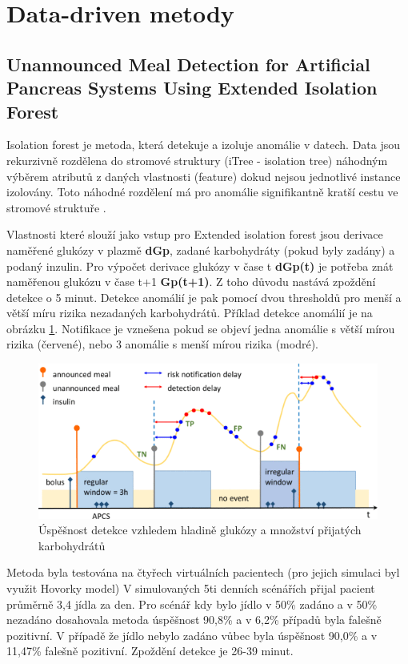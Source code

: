 \section{Data-driven metody}
\subsection{Unannounced Meal Detection for Artificial Pancreas Systems Using Extended Isolation Forest \citep{Analyza.ExtendedIsolationForest}}
\label{ch:forest}

Isolation forest je metoda, která detekuje a izoluje anomálie v datech. Data jsou rekurzivně rozdělena do stromové struktury (iTree - isolation tree) náhodným výběrem atributů z daných vlastnosti (feature) dokud nejsou jednotlivé instance izolovány. Toto náhodné rozdělení má pro anomálie signifikantně kratší cestu ve stromové struktuře \citep{Analyza.IsolationForest}.

Vlastnosti které slouží jako vstup pro Extended isolation forest jsou derivace naměřené glukózy v plazmě \textbf{dGp}, zadané karbohydráty (pokud byly zadány) a podaný inzulin. Pro výpočet derivace glukózy v čase t \textbf{dGp(t)} je potřeba znát naměřenou glukózu v čase t+1 \textbf{Gp(t+1)}. Z toho důvodu nastává zpoždění detekce o 5 minut. Detekce anomálií je pak pomocí dvou thresholdů pro menší a větší míru rizika nezadaných karbohydrátů.
Příklad detekce anomálií je na obrázku \ref{fig:forest}. Notifikace je vznešena pokud se objeví jedna anomálie s větší mírou rizika (červené), nebo 3 anomálie s menší mírou rizika (modré).

\begin{figure}[H]
\caption{Úspěšnost detekce vzhledem hladině glukózy a množství přijatých karbohydrátů}
\label{fig:forest}
\includegraphics[width=1\textwidth]{img/analyza/forest.png}
\end{figure}

Metoda byla testována na čtyřech virtuálních pacientech (pro jejich simulaci byl využit Hovorky model) V simulovaných 5ti denních scénářích přijal pacient průměrně 3,4 jídla za den. Pro scénář kdy bylo jídlo v 50\% zadáno a v 50\% nezadáno dosahovala metoda úspěšnost 90,8\% a v 6,2\% případů byla falešně pozitivní. V případě že jídlo nebylo zadáno vůbec byla úspěšnost 90,0\% a v 11,47\% falešně pozitivní. Zpoždění detekce je 26-39 minut.


